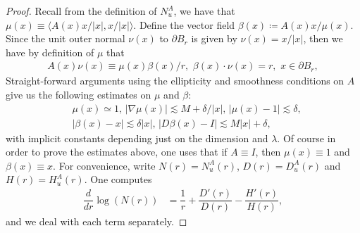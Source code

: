 \documentclass[12pt,leqno]{amsart}
\numberwithin{equation}{section}
\theoremstyle{definition}
\newcommand{\abs}[1]{\left \lvert #1 \right \rvert}
\begin{document}
	\begin{proof}
		Recall from the definition of $N_u^A$, we have that $\mu(x) \equiv \langle A(x)x/\abs{x}, x/\abs{x}\rangle$. Define the vector field $\beta(x) \coloneqq A(x)x/\mu(x)$. Since the unit outer normal $\nu(x)$ to $\partial B_r$ is given by $\nu(x) = x/\abs{x}$, then we have by definition of $\mu$ that
		\begin{align}
			A(x) \nu(x) \equiv \mu(x) \beta(x)/r, \, \,  \beta(x) \cdot \nu(x) = r, \, \, x \in \partial B_r,  \label{eqn:beta_norm}
		\end{align}
		Straight-forward arguments using the ellipticity and smoothness conditions on $A$ give us the following estimates on $\mu$ and $\beta$:
		\begin{align}
			& \mu(x)  \simeq 1, \, \abs{\nabla \mu(x)} \lesssim M + \delta/\abs{x}, \, \abs{\mu(x)  -1} \lesssim \delta, \label{eqn:mu_est} \\
			& \abs{\beta(x) - x} \lesssim \delta \abs{x}, \, \abs{D\beta(x) - I} \lesssim  M \abs{x}  + \delta, \label{eqn:beta_est}
		\end{align}
		with implicit constants depending just on the dimension and $\lambda$. Of course in order to prove the estimates above, one uses that if $A \equiv I$, then $\mu(x) \equiv 1$ and $\beta(x) \equiv x$. 
		For convenience, write $N(r) = N_u^A(r)$, $D(r) = D_u^A(r)$ and $H(r) = H_u^A(r)$. One computes
		\begin{align}\label{eqn:logN'}
			\dfrac{d}{dr} \log(N(r)) & = \dfrac{1}{r}  + \dfrac{D'(r)}{D(r)} - \dfrac{H'(r)}{H(r)},
		\end{align}
		and we deal with each term separately.
		

\end{proof}
\end{document}
